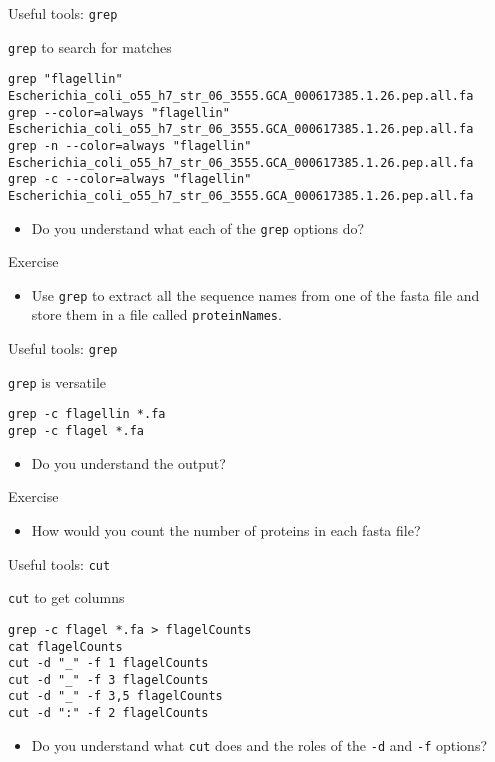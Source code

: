 \documentclass[big]{beamer}
\begin{document}
\begin{frame}[fragile,label=sec-3-3]{Useful tools: \texttt{grep}}
 \begin{block}{\texttt{grep} to search for matches}
\begin{verbatim}
grep "flagellin" Escherichia_coli_o55_h7_str_06_3555.GCA_000617385.1.26.pep.all.fa
grep --color=always "flagellin" Escherichia_coli_o55_h7_str_06_3555.GCA_000617385.1.26.pep.all.fa
grep -n --color=always "flagellin" Escherichia_coli_o55_h7_str_06_3555.GCA_000617385.1.26.pep.all.fa
grep -c --color=always "flagellin" Escherichia_coli_o55_h7_str_06_3555.GCA_000617385.1.26.pep.all.fa
\end{verbatim}
\begin{itemize}
\item Do you understand what each of the \texttt{grep} options do?
\end{itemize}
\end{block}
\begin{block}{Exercise}
\begin{itemize}
\item Use \texttt{grep} to extract all the sequence names from one of the fasta file and
store them in a file called \texttt{proteinNames}.
\end{itemize}
\end{block}
\end{frame}
\begin{frame}[fragile,label=sec-3-4]{Useful tools: \texttt{grep}}
 \begin{block}{\texttt{grep} is versatile}
\begin{verbatim}
grep -c flagellin *.fa
grep -c flagel *.fa
\end{verbatim}
\begin{itemize}
\item Do you understand the output?
\end{itemize}
\end{block}
\begin{block}{Exercise}
\begin{itemize}
\item How would you count the number of proteins in each fasta file?
\end{itemize}
\end{block}
\end{frame}
\begin{frame}[fragile,label=sec-3-5]{Useful tools: \texttt{cut}}
 \begin{block}{\texttt{cut} to get columns}
\begin{verbatim}
grep -c flagel *.fa > flagelCounts
cat flagelCounts
cut -d "_" -f 1 flagelCounts
cut -d "_" -f 3 flagelCounts
cut -d "_" -f 3,5 flagelCounts
cut -d ":" -f 2 flagelCounts
\end{verbatim}
\begin{itemize}
\item Do you understand what \texttt{cut} does and the roles of the \texttt{-d} and \texttt{-f} options?
\end{itemize}
\end{block}
\end{frame}
\end{document}
